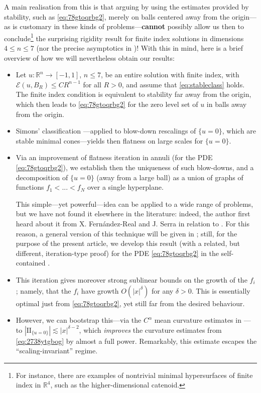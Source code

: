 \documentclass{article}
\newcommand{\R}{\mathbb{R}}
\theoremstyle{definition}
\begin{document}
A main realisation from this is that arguing by using the estimates provided by stability, such as \eqref{eq:78gtoqrbg2}, merely on balls centered away from the origin---as is customary in these kinds of problems---{\bf cannot} possibly allow us then to conclude\footnote{For instance, there are examples of nontrivial minimal hypersurfaces of finite index in $\R^4$, such as the higher-dimensional catenoid.} the surprising rigidity result for finite index solutions in dimensions $4\leq n \leq 7$ (nor the precise asymptotics in )! With this in mind, here is a brief overview of how we will nevertheless obtain our results:
\begin{itemize}
    \item Let $u:\R^n\to[-1,1]$, $n\leq 7$, be an entire solution with finite index, with $\mathcal E(u,B_R)\leq C R^{n-1}$ for all $R>0$, and assume that \eqref{eq:stableclass} holds. The finite index condition is equivalent to stability far away from the origin, which then leads to \eqref{eq:78gtoqrbg2} for the zero level set of $u$ in balls away from the origin.
    \item Simons' classification \cite{Simons68}---applied to blow-down rescalings of $\{u=0\}$, which are stable minimal cones---yields then flatness on large scales for $\{u=0\}$.
    \item Via an improvement of flatness iteration in annuli (for the PDE \eqref{eq:78gtoqrbg2}), we establish then the uniqueness of such blow-downs, and a decomposition of $\{u=0\}$ (away from a large ball) as a union of graphs of functions $f_1<...<f_N$ over a single hyperplane.
    
    This simple---yet powerful---idea can be applied to a wide range of problems, but we have not found it elsewhere in the literature: indeed, the author first heard about it from X. Fern\'andez-Real and J. Serra in relation to \cite{CFFS25}. For this reason, a general version of this technique will be given in \cite{FFS25A}; still, for the purpose of the present article, we develop this result (with a related, but different, iteration-type proof) for the PDE \eqref{eq:78gtoqrbg2} in the self-contained .
    \item This iteration gives moreover strong sublinear bounds on the growth of the $f_i$; namely, that the $f_i$ have growth $O(|x|^{\delta})$ for any $\delta>0$. This is essentially optimal just from \eqref{eq:78gtoqrbg2}, yet still far from the desired behaviour. 
    \item However, we can bootstrap this---via the $C^{\alpha}$ mean curvature estimates in \cite{WW19}---to $|\mathrm{II}_{\{u=0\}}|\lesssim|x|^{\delta-2}$, which {\it improves} the curvature estimates from \eqref{eq:2738ytgbog} by almost a full power. Remarkably, this estimate escapes the ``scaling-invariant'' regime.
    \end{itemize}
\end{document}
